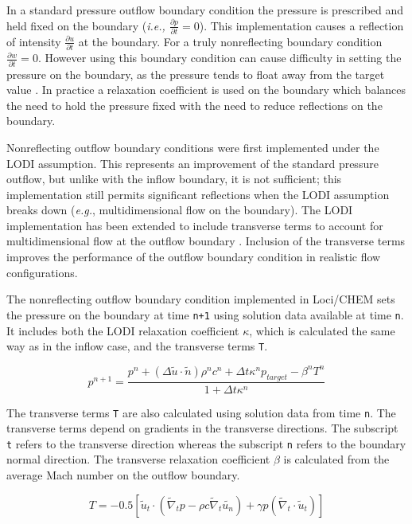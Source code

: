 \documentclass{article}
\begin{document}
In a standard pressure outflow boundary condition the pressure is prescribed and held fixed on the boundary ({\it{i.e.}, \tt $\frac{\partial p}{\partial t} = 0$}). This implementation causes a reflection of intensity {\tt $\frac{\partial u}{\partial t}$} at the boundary.  For a truly nonreflecting boundary condition {\tt $\frac{\partial w}{\partial t} = 0 $}. However using this boundary condition can cause difficulty in setting the pressure on the boundary, as the pressure tends to float away from the target value \cite{Granet}.  In practice a relaxation coefficient is used on the boundary which balances the need to hold the pressure fixed with the need to reduce reflections on the boundary.

Nonreflecting outflow boundary conditions were first implemented under the LODI assumption. This represents an improvement of the standard pressure outflow, but unlike with the inflow boundary, it is not sufficient; this implementation still permits significant reflections when the LODI assumption breaks down ({\it{e.g.}}, multidimensional flow on the boundary). The LODI implementation has been extended to include transverse terms to account for multidimensional flow at the outflow boundary \cite{Yoo1}. Inclusion of the transverse terms improves the performance of the outflow boundary condition in realistic flow configurations.

The nonreflecting outflow boundary condition implemented in Loci/CHEM sets the pressure on the boundary at time {\tt n+1} using solution data available at time {\tt n}. It includes both the LODI relaxation coefficient {\tt $\kappa$}, which is calculated the same way as in the inflow case, and the transverse terms {\tt T}.

\begin{equation}
p^{n+1} = \frac{p^n + \left( \Delta \tilde{u} \cdot \tilde{n} \right) \rho^n c^n + \Delta t \kappa^n p_{target} - \beta^n T^n}{1 + \Delta t \kappa^n}
\end{equation}

The transverse terms {\tt T} are also calculated using solution data from time {\tt n}. The transverse terms depend on gradients in the transverse directions. The subscript {\tt t} refers to the transverse direction whereas the subscript {\tt n} refers to the boundary normal direction. The transverse relaxation coefficient {\tt $\beta$} is calculated from the average Mach number on the outflow boundary.


\begin{equation}
T = - 0.5 \left[ \tilde{u}_t \cdot \left( \tilde{\nabla}_t p - \rho c \tilde{\nabla}_t \tilde{u_n} \right) + \gamma p \left( \tilde{\nabla}_t \cdot \tilde{u}_t \right) \right]
\end{equation}
\end{document}
